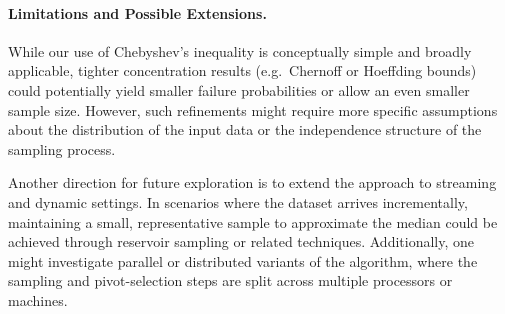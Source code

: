 \paragraph{Limitations and Possible Extensions.}
While our use of Chebyshev’s inequality is conceptually simple and broadly applicable, tighter concentration results (e.g.\ Chernoff or Hoeffding bounds) could potentially yield smaller failure probabilities or allow an even smaller sample size. However, such refinements might require more specific assumptions about the distribution of the input data or the independence structure of the sampling process.

Another direction for future exploration is to extend the approach to streaming and dynamic settings. In scenarios where the dataset arrives incrementally, maintaining a small, representative sample to approximate the median could be achieved through reservoir sampling or related techniques. Additionally, one might investigate parallel or distributed variants of the algorithm, where the sampling and pivot-selection steps are split across multiple processors or machines.

